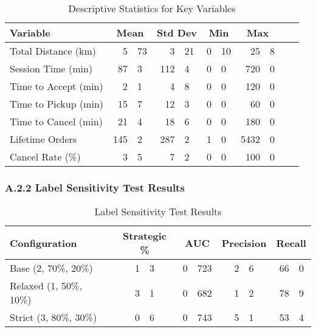 \begin{table}[H]
\centering
\caption{Descriptive Statistics for Key Variables}
\label{tab:descriptive_stats}
\begin{tabular}{l r@{.}l r@{.}l r@{.}l r@{.}l r@{.}l}
\toprule
\textbf{Variable} & \multicolumn{2}{c}{\textbf{Mean}} & \multicolumn{2}{c}{\textbf{Std Dev}} & \multicolumn{2}{c}{\textbf{Min}} & \multicolumn{2}{c}{\textbf{Max}} \\
\midrule
Total Distance (km)       & 5&73  & 3&21  & 0&10  & 25&8  \\
Session Time (min)        & 87&3  & 112&4 & 0&0   & 720&0 \\
Time to Accept (min)      & 2&1   & 4&8   & 0&0   & 120&0 \\
Time to Pickup (min)      & 15&7  & 12&3  & 0&0   & 60&0 \\
Time to Cancel (min)      & 21&4  & 18&6  & 0&0   & 180&0 \\
Lifetime Orders           & 145&2 & 287&2 & 1&0   & 5432&0 \\
Cancel Rate (\%)          & 3&5   & 7&2   & 0&0   & 100&0 \\
\bottomrule
\end{tabular}
\end{table}

\subsubsection*{A.2.2 Label Sensitivity Test Results}

\begin{table}[H]
\centering
\caption{Label Sensitivity Test Results}
\label{tab:label_sensitivity}
\begin{tabular}{p{4.5cm} r@{.}l r@{.}l r@{.}l r@{.}l}
\toprule
\textbf{Configuration} & \multicolumn{2}{c}{\textbf{Strategic \%}} & \multicolumn{2}{c}{\textbf{AUC}} & \multicolumn{2}{c}{\textbf{Precision}} & \multicolumn{2}{c}{\textbf{Recall}} \\
\midrule
Base (2, 70\%, 20\%)     & 1&3  & 0&723 & 2&6 & 66&0 \\
Relaxed (1, 50\%, 10\%)  & 3&1  & 0&682 & 1&2 & 78&9 \\
Strict (3, 80\%, 30\%)   & 0&6  & 0&743 & 5&1 & 53&4 \\
\bottomrule
\end{tabular}
\end{table}

\vspace{1em}

